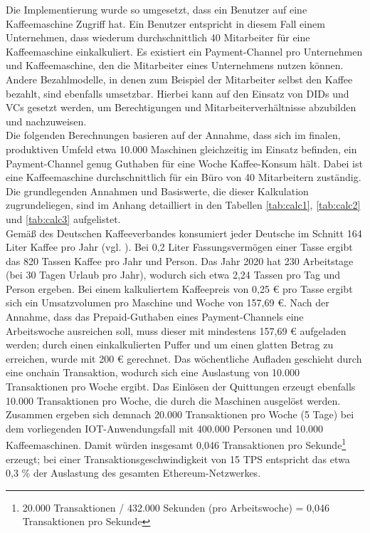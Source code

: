 Die Implementierung wurde so umgesetzt, dass ein Benutzer auf eine Kaffeemaschine Zugriff hat. Ein Benutzer entspricht in diesem Fall einem Unternehmen, dass wiederum durchschnittlich 40 Mitarbeiter für eine Kaffeemaschine einkalkuliert. Es existiert ein Payment-Channel pro Unternehmen und Kaffeemaschine, den die Mitarbeiter eines Unternehmens nutzen können. Andere Bezahlmodelle, in denen zum Beispiel der Mitarbeiter selbst den Kaffee bezahlt, sind ebenfalls umsetzbar. Hierbei kann auf den Einsatz von \acp{DID} und \acp{VC} gesetzt werden, um Berechtigungen und Mitarbeiterverhältnisse abzubilden und nachzuweisen.\\

Die folgenden Berechnungen basieren auf der Annahme, dass sich im finalen, produktiven Umfeld etwa 10.000 Maschinen gleichzeitig im Einsatz befinden, ein Payment-Channel genug Guthaben für eine Woche Kaffee-Konsum hält. Dabei ist eine Kaffeemaschine durchschnittlich für ein Büro von 40 Mitarbeitern zuständig. Die grundlegenden Annahmen und Basiswerte, die dieser Kalkulation zugrundeliegen, sind im Anhang detailliert in den Tabellen \ref{tab:calc1}, \ref{tab:calc2} und \ref{tab:calc3} aufgelistet.\\
Gemäß des Deutschen Kaffeeverbandes konsumiert jeder Deutsche im Schnitt 164 Liter Kaffee pro Jahr (vgl. \cite{Kaffee2019}). Bei 0,2 Liter Fassungsvermögen einer Tasse ergibt das 820 Tassen Kaffee pro Jahr und Person. Das Jahr 2020 hat 230 Arbeitstage (bei 30 Tagen Urlaub pro Jahr), wodurch sich etwa 2,24 Tassen pro Tag und Person ergeben. Bei einem kalkuliertem Kaffeepreis von 0,25 € pro Tasse ergibt sich ein Umsatzvolumen pro Maschine und Woche von 157,69 €. Nach der Annahme, dass das Prepaid-Guthaben eines Payment-Channels eine Arbeitswoche ausreichen soll, muss dieser mit mindestens 157,69 € aufgeladen werden; durch einen einkalkulierten Puffer und um einen glatten Betrag zu erreichen, wurde mit 200 € gerechnet. Das wöchentliche Aufladen geschieht durch eine onchain Transaktion, wodurch sich eine Auslastung von 10.000 Transaktionen pro Woche ergibt. Das Einlösen der Quittungen erzeugt ebenfalls 10.000 Transaktionen pro Woche, die durch die Maschinen ausgelöst werden. Zusammen ergeben sich demnach 20.000 Transaktionen pro Woche (5 Tage) bei dem vorliegenden IOT-Anwendungsfall mit 400.000 Personen und 10.000 Kaffeemaschinen. Damit würden insgesamt 0,046 Transaktionen pro Sekunde\footnote{20.000 Transaktionen / 432.000 Sekunden (pro Arbeitswoche) = 0,046 Transaktionen pro Sekunde} erzeugt; bei einer Transaktionsgeschwindigkeit von 15 \ac{TPS} entspricht das etwa 0,3 \% der Auslastung des gesamten Ethereum-Netzwerkes.\\

